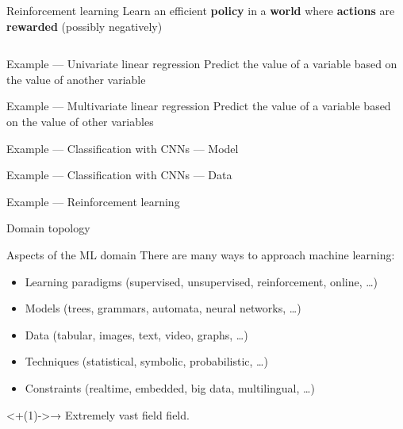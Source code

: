\begin{frame}{Reinforcement learning}
  Learn an efficient \textbf{policy} in a \textbf{world} where \textbf{actions} are \textbf{rewarded} (possibly negatively)
  \vfill
  \begin{columns}[T]
    \begin{column}{0.5\textwidth}
    \end{column}
    \begin{column}{0.5\textwidth}
    \end{column}
  \end{columns}
\end{frame}

\begin{frame}{Example --- Univariate linear regression}
  Predict the value of a variable based on the value of another variable

\end{frame}

\begin{frame}{Example --- Multivariate linear regression}
  Predict the value of a variable based on the value of other variables

\end{frame}

\begin{frame}{Example --- Classification with CNNs --- Model}
\end{frame}

\begin{frame}{Example --- Classification with CNNs --- Data}
\end{frame}

\begin{frame}{Example --- Reinforcement learning}
\end{frame}

\begin{frame}{Domain topology}
\end{frame}

\begin{frame}{Aspects of the ML domain}
  There are many ways to approach machine learning:
  \begin{itemize}[<+(1)->]
  \item Learning paradigms (supervised, unsupervised, reinforcement, online, …)
  \item Models (trees, grammars, automata, neural networks, …)
  \item Data (tabular, images, text, video, graphs, …)
  \item Techniques (statistical, symbolic, probabilistic, …)
  \item Constraints (realtime, embedded, big data, multilingual, …)
  \end{itemize}

  \onslide<+(1)->{→ Extremely vast field field.}
\end{frame}

